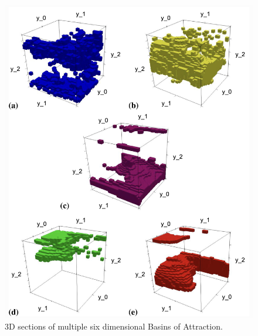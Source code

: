 \begin{figure}[ht]
    \centering
    \includegraphics[width=.9\linewidth]{figures/IMG_0783.jpg}
    \caption{3D sections of multiple six dimensional Basins of Attraction. \cite{sixdim}}
    \label{fig:sboa}
\end{figure}


